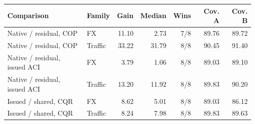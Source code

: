 \begin{tabular}{llrrrrr}
\toprule
Comparison & Family & Gain & Median & Wins & Cov. A & Cov. B \\
\midrule
Native / residual, COP & FX & 11.10 & 2.73 & 7/8 & 89.76 & 89.72 \\
Native / residual, COP & Traffic & 33.22 & 31.79 & 8/8 & 90.45 & 91.40 \\
Native / residual, issued ACI & FX & 3.79 & 1.06 & 8/8 & 89.03 & 89.10 \\
Native / residual, issued ACI & Traffic & 13.20 & 11.92 & 8/8 & 89.83 & 90.20 \\
Issued / shared, CQR & FX & 8.62 & 5.01 & 8/8 & 89.03 & 86.12 \\
Issued / shared, CQR & Traffic & 8.24 & 7.98 & 8/8 & 89.83 & 89.63 \\
\bottomrule
\end{tabular}
